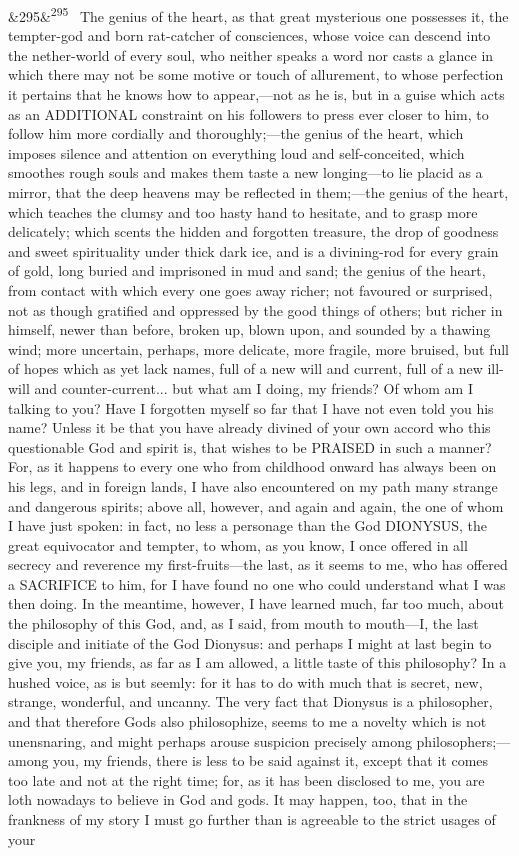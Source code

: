 \documentclass[12pt]{article}
\newcommand{\para}[1][]{\par\noindent\ifx&#1&\else\textsuperscript{\footnotesize #1}~\fi}
\begin{document}
\para[295] The genius of the heart, as that great mysterious one possesses it, the tempter-god and born rat-catcher of consciences, whose voice can descend into the nether-world of every soul, who neither speaks a word nor casts a glance in which there may not be some motive or touch of allurement, to whose perfection it pertains that he knows how to appear,---not as he is, but in a guise which acts as an ADDITIONAL constraint on his followers to press ever closer to him, to follow him more cordially and thoroughly;---the genius of the heart, which imposes silence and attention on everything loud and self-conceited, which smoothes rough souls and makes them taste a new longing---to lie placid as a mirror, that the deep heavens may be reflected in them;---the genius of the heart, which teaches the clumsy and too hasty hand to hesitate, and to grasp more delicately; which scents the hidden and forgotten treasure, the drop of goodness and sweet spirituality under thick dark ice, and is a divining-rod for every grain of gold, long buried and imprisoned in mud and sand; the genius of the heart, from contact with which every one goes away richer; not favoured or surprised, not as though gratified and oppressed by the good things of others; but richer in himself, newer than before, broken up, blown upon, and sounded by a thawing wind; more uncertain, perhaps, more delicate, more fragile, more bruised, but full of hopes which as yet lack names, full of a new will and current, full of a new ill-will and counter-current... but what am I doing, my friends? Of whom am I talking to you? Have I forgotten myself so far that I have not even told you his name? Unless it be that you have already divined of your own accord who this questionable God and spirit is, that wishes to be PRAISED in such a manner? For, as it happens to every one who from childhood onward has always been on his legs, and in foreign lands, I have also encountered on my path many strange and dangerous spirits; above all, however, and again and again, the one of whom I have just spoken: in fact, no less a personage than the God DIONYSUS, the great equivocator and tempter, to whom, as you know, I once offered in all secrecy and reverence my first-fruits---the last, as it seems to me, who has offered a SACRIFICE to him, for I have found no one who could understand what I was then doing. In the meantime, however, I have learned much, far too much, about the philosophy of this God, and, as I said, from mouth to mouth---I, the last disciple and initiate of the God Dionysus: and perhaps I might at last begin to give you, my friends, as far as I am allowed, a little taste of this philosophy? In a hushed voice, as is but seemly: for it has to do with much that is secret, new, strange, wonderful, and uncanny. The very fact that Dionysus is a philosopher, and that therefore Gods also philosophize, seems to me a novelty which is not unensnaring, and might perhaps arouse suspicion precisely among philosophers;---among you, my friends, there is less to be said against it, except that it comes too late and not at the right time; for, as it has been disclosed to me, you are loth nowadays to believe in God and gods. It may happen, too, that in the frankness of my story I must go further than is agreeable to the strict usages of your 
\end{document}
